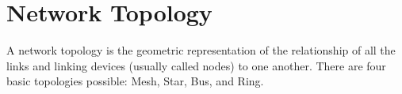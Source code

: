 




\section{Network Topology}
A network topology is the geometric representation of the relationship of all the links and linking devices (usually called nodes) to one another. There are four basic topologies possible: Mesh, Star, Bus, and Ring.

